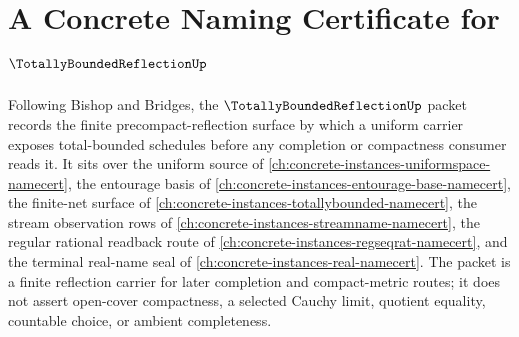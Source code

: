 \chapter{A Concrete Naming Certificate for $\TotallyBoundedReflectionUp$}
\label{ch:concrete-instances-totally-bounded-reflection-namecert}

Following Bishop and Bridges, the $\TotallyBoundedReflectionUp$ packet records the finite precompact-reflection surface by which a uniform carrier exposes total-bounded schedules before any completion or compactness consumer reads it. It sits over the uniform source of \autoref{ch:concrete-instances-uniformspace-namecert}, the entourage basis of \autoref{ch:concrete-instances-entourage-base-namecert}, the finite-net surface of \autoref{ch:concrete-instances-totallybounded-namecert}, the stream observation rows of \autoref{ch:concrete-instances-streamname-namecert}, the regular rational readback route of \autoref{ch:concrete-instances-regseqrat-namecert}, and the terminal real-name seal of \autoref{ch:concrete-instances-real-namecert}. The packet is a finite reflection carrier for later completion and compact-metric routes; it does not assert open-cover compactness, a selected Cauchy limit, quotient equality, countable choice, or ambient completeness.

